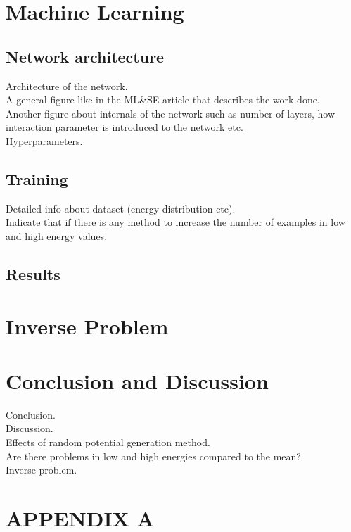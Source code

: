 \documentclass[a4paper,times,12pt]{article}
\begin{document}
\section{Machine Learning}
\subsection{Network architecture}
\noindent Architecture of the network.\\
    A general figure like in the ML\&SE article that describes the work done.\\
    Another figure about internals of the network such as number of layers, how interaction parameter is introduced to the network etc.\\
    Hyperparameters.\\
\subsection{Training}
\noindent    Detailed info about dataset (energy distribution etc).\\
    Indicate that if there is any method to increase the number of examples in low and high energy values.

\subsection{Results}

\section{Inverse Problem}

\clearpage
\section{Conclusion and Discussion}

\noindent Conclusion.\\
    Discussion.\\
    Effects of random potential generation method.\\
    Are there problems in low and high energies compared to the mean?\\
    Inverse problem.\\


\clearpage


\appendix
\section{APPENDIX A}
\end{document}
